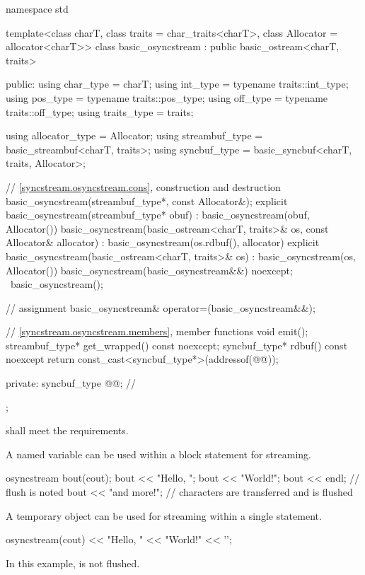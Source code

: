 %
\begin{codeblock}
namespace std {
  template<class charT, class traits = char_traits<charT>, class Allocator = allocator<charT>>
  class basic_osyncstream : public basic_ostream<charT, traits> {
  public:
    using char_type   = charT;
    using int_type    = typename traits::int_type;
    using pos_type    = typename traits::pos_type;
    using off_type    = typename traits::off_type;
    using traits_type = traits;

    using allocator_type = Allocator;
    using streambuf_type = basic_streambuf<charT, traits>;
    using syncbuf_type   = basic_syncbuf<charT, traits, Allocator>;

    // \ref{syncstream.osyncstream.cons}, construction and destruction
    basic_osyncstream(streambuf_type*, const Allocator&);
    explicit basic_osyncstream(streambuf_type* obuf)
      : basic_osyncstream(obuf, Allocator()) {}
    basic_osyncstream(basic_ostream<charT, traits>& os, const Allocator& allocator)
      : basic_osyncstream(os.rdbuf(), allocator) {}
    explicit basic_osyncstream(basic_ostream<charT, traits>& os)
      : basic_osyncstream(os, Allocator()) {}
    basic_osyncstream(basic_osyncstream&&) noexcept;
    ~basic_osyncstream();

    // assignment
    basic_osyncstream& operator=(basic_osyncstream&&);

    // \ref{syncstream.osyncstream.members}, member functions
    void emit();
    streambuf_type* get_wrapped() const noexcept;
    syncbuf_type* rdbuf() const noexcept { return const_cast<syncbuf_type*>(addressof(@@)); }

  private:
    syncbuf_type @@;    // \expos
  };
}
\end{codeblock}

\pnum
{} shall meet
the  requirements.

\pnum
\begin{example}
A named variable can be used within a block statement for streaming.
\begin{codeblock}
{
  osyncstream bout(cout);
  bout << "Hello, ";
  bout << "World!";
  bout << endl; // flush is noted
  bout << "and more!\n";
}   // characters are transferred and  is flushed
\end{codeblock}
\end{example}

\pnum
\begin{example}
A temporary object can be used for streaming within a single statement.
\begin{codeblock}
osyncstream(cout) << "Hello, " << "World!" << '\n';
\end{codeblock}
In this example,  is not flushed.
\end{example}


